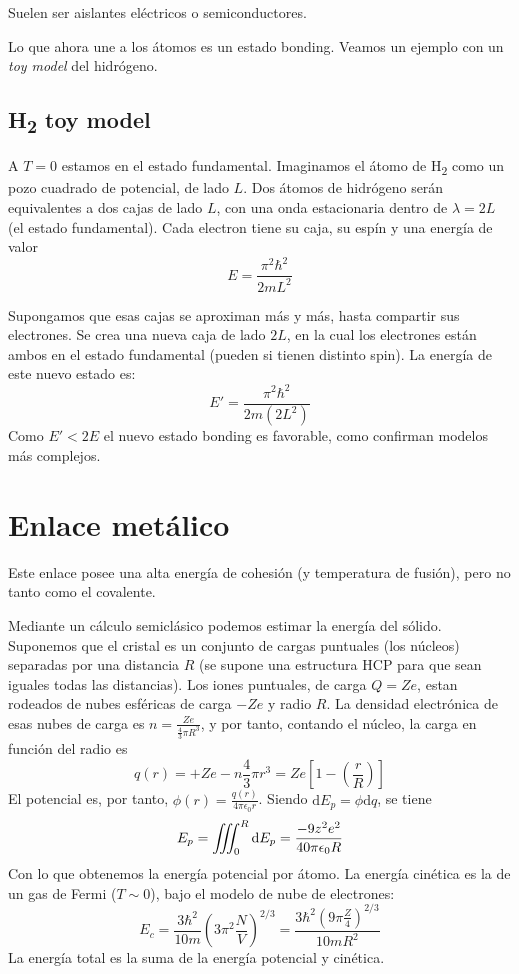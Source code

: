 Suelen ser aislantes eléctricos o semiconductores.

Lo que ahora une a los átomos es un estado bonding. Veamos un ejemplo
con un \emph{toy model} del hidrógeno.

\subsection{H\textsubscript{2} toy model}
A $T=0$ estamos en el estado fundamental. Imaginamos el átomo de
H\textsubscript{2} como un pozo cuadrado de potencial, de lado
$L$. Dos átomos de hidrógeno serán equivalentes a dos cajas de lado
$L$, con una onda estacionaria dentro de $\lambda = 2L$ (el estado
fundamental). Cada electron tiene su caja, su espín y una energía de
valor
\begin{equation}
  E = \frac{\pi^2 \hbar^2}{2mL^2}
\end{equation}

Supongamos que esas cajas se aproximan más y más, hasta compartir sus
electrones. Se crea una nueva caja de lado $2L$, en la cual los
electrones están ambos en el estado fundamental (pueden si tienen
distinto spin). La energía de este nuevo estado es:
\begin{equation}
  E' = \frac{\pi^2 \hbar^2}{2m(2L^2)}
\end{equation}
Como $E' < 2E$ el nuevo estado bonding es favorable, como confirman
modelos más complejos.

\section{Enlace metálico}
Este enlace posee una alta energía de cohesión (y temperatura de
fusión), pero no tanto como el covalente. 

Mediante un cálculo semiclásico podemos estimar la energía del sólido.
Suponemos que el cristal es un conjunto de cargas puntuales (los
núcleos) separadas por una distancia $R$ (se supone una estructura HCP
para que sean iguales todas las distancias). Los iones puntuales, de
carga $Q=Ze$, estan rodeados de nubes esféricas de carga $-Ze$ y radio
$R$. La densidad electrónica de esas nubes de carga es $n =
\frac{Ze}{\frac{4}{3}\pi R^3}$, y por tanto, contando el núcleo, la
carga en función del radio es
\begin{equation}
  q(r) = +Ze - n \frac{4}{3}\pi r^3 = Ze \left[ 1 - \left( \frac{r}{R} \right) \right]
\end{equation}
El potencial es, por tanto, $\phi(r) = \frac{q(r)}{4\pi \epsilon_0
  r}$. Siendo $\text{d}E_p = \phi \text{d}q$, se tiene
\begin{equation}
  E_p = \myiiint_0^R \text{d}E_p = \frac{-9z^2 e^2}{40 \pi \epsilon_0 R}
\end{equation}
Con lo que obtenemos la energía potencial por átomo. La energía
cinética es la de un gas de Fermi ($T\sim 0$), bajo el modelo de nube de electrones:
\begin{equation}
  E_c = \frac{3\hbar^2}{10m}\left( 3\pi^2 \frac{N}{V} \right)^{2/3} =
  \frac{3\hbar^2 (9\pi \frac{Z}{4})^{2/3}}{10mR^2}
\end{equation}
La energía total es la suma de la energía potencial y cinética.

